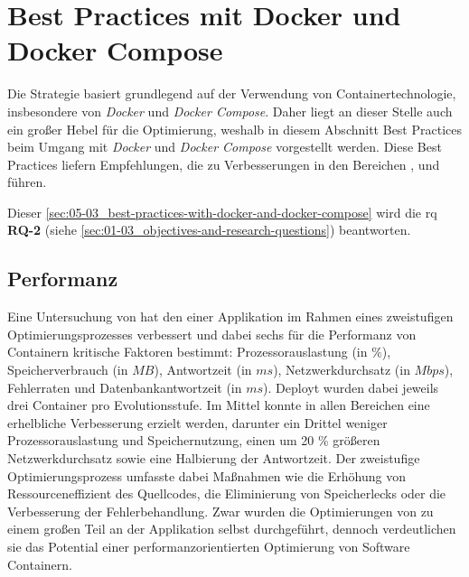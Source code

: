 \section{Best Practices mit Docker und Docker Compose}
\label{sec:05-03_best-practices-with-docker-and-docker-compose}

Die  Strategie basiert grundlegend auf der Verwendung von Containertechnologie, insbesondere von \textit{Docker} und \textit{Docker Compose}. Daher liegt an dieser Stelle auch ein großer Hebel für die Optimierung, weshalb in diesem Abschnitt Best Practices beim Umgang mit \textit{Docker} und \textit{Docker Compose} vorgestellt werden. Diese Best Practices liefern Empfehlungen, die zu Verbesserungen in den Bereichen ,  und  führen.

Dieser \autoref{sec:05-03_best-practices-with-docker-and-docker-compose} wird die \acrlong{rq} \textbf{RQ-2} (siehe \autoref{sec:01-03_objectives-and-research-questions}) beantworten.

\subsection{Performanz}
\label{subsec:05-03-01_performance}

Eine Untersuchung von \citeauthor{002:Optimizing-Cloud-Applications-with-DevOps} hat den  einer Applikation im Rahmen eines zweistufigen Optimierungsprozesses verbessert und dabei sechs für die Performanz von Containern kritische Faktoren bestimmt: Prozessorauslastung (in $\%$), Speicherverbrauch (in $MB$), Antwortzeit (in $ms$), Netzwerkdurchsatz (in $Mbps$), Fehlerraten und Datenbankantwortzeit (in $ms$). Deployt wurden dabei jeweils drei Container pro Evolutionsstufe. Im Mittel konnte in allen Bereichen eine erhelbliche Verbesserung erzielt werden, darunter ein Drittel weniger Prozessorauslastung und Speichernutzung, einen um 20 \% größeren Netzwerkdurchsatz sowie eine Halbierung der Antwortzeit. Der zweistufige Optimierungsprozess umfasste dabei Maßnahmen wie die Erhöhung von Ressourceneffizient des Quellcodes, die Eliminierung von Speicherlecks oder die Verbesserung der Fehlerbehandlung. \cite{002:Optimizing-Cloud-Applications-with-DevOps} Zwar wurden die Optimierungen von \citeauthor{002:Optimizing-Cloud-Applications-with-DevOps} zu einem großen Teil an der Applikation selbst durchgeführt, dennoch verdeutlichen sie das Potential einer performanzorientierten Optimierung von Software Containern.

